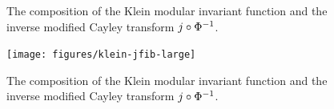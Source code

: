 \begin{figure}
\begin{tabular}{c c}
\end{tabular}
\caption{The composition of the Klein modular invariant function and the inverse modified Cayley transform $j \circ {\Phi}^{-1}$.}
\label{fig_FunctionsOfJ}
\end{figure}

\begin{figure}
\centering
\texttt{[image: figures/klein-jfib-large]}
\caption{The composition of the Klein modular invariant function and the inverse modified Cayley transform $j \circ {\Phi}^{-1}$.}
\label{fig_KleinJ_Fib}
\end{figure}
